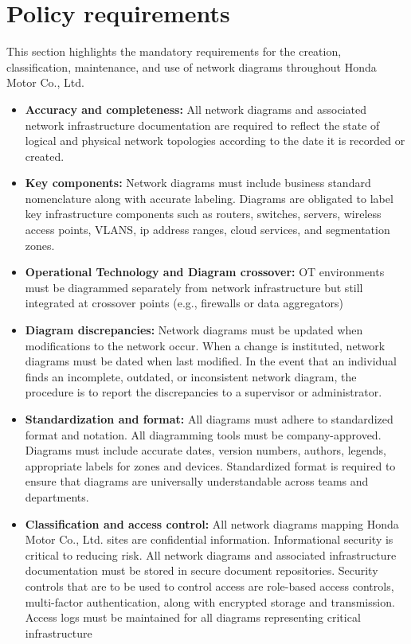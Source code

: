\section{Policy requirements}
This section highlights the mandatory requirements for the creation, classification, maintenance, and use of network diagrams throughout Honda Motor Co., Ltd.
\begin{itemize}
    \item \textbf{Accuracy and completeness:} All network diagrams and associated network infrastructure documentation are required to reflect the state of logical and physical network topologies according to the date it is recorded or created.
    \item \textbf{Key components:} Network diagrams must include business standard nomenclature along with accurate labeling. Diagrams are obligated to label key infrastructure components such as routers, switches, servers, wireless access points, VLANS, ip address ranges, cloud services, and segmentation zones.
    \item \textbf{Operational Technology and Diagram crossover:} OT environments must be diagrammed separately from network infrastructure but still integrated at crossover points (e.g., firewalls or data aggregators)
    \item \textbf{Diagram discrepancies:} Network diagrams must be updated when modifications to the network occur. When a change is instituted, network diagrams must be dated when last modified. In the event that an individual finds an incomplete, outdated, or inconsistent network diagram, the procedure is to report the discrepancies to a supervisor or administrator.
    \item \textbf{Standardization and format:} All diagrams must adhere to standardized format and notation. All diagramming tools must be company-approved. Diagrams must include accurate dates, version numbers, authors, legends, appropriate labels for zones and devices. Standardized format is required to ensure that diagrams are universally understandable across teams and departments.
    \item \textbf{Classification and access control:} All network diagrams mapping Honda Motor Co., Ltd. sites are confidential information. Informational security is critical to reducing risk. All network diagrams and associated infrastructure documentation must be stored in secure document repositories. Security controls that are to be used to control access are role-based access controls, multi-factor authentication, along with encrypted storage and transmission. Access logs must be maintained for all diagrams representing critical infrastructure

\end{itemize}
